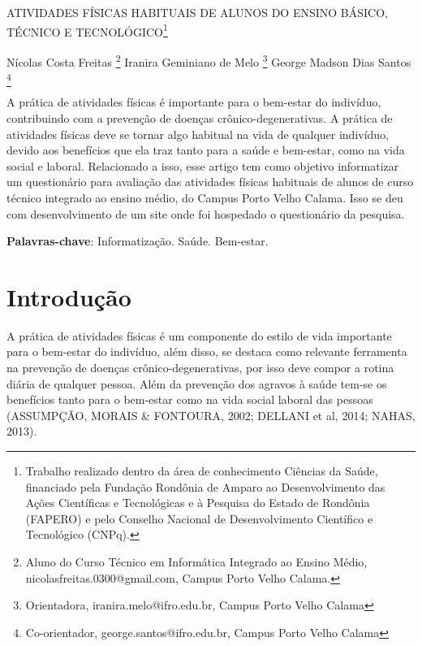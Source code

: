 \documentclass[article,12pt,onesidea,4paper,english,brazil,]{abntex2}
\begin{document}
	
	
	\frenchspacing 
	
	\begin{center}
		\LARGE ATIVIDADES FÍSICAS HABITUAIS DE ALUNOS DO ENSINO BÁSICO, TÉCNICO E TECNOLÓGICO\footnote{Trabalho realizado dentro da área de conhecimento Ciências da Saúde, financiado pela Fundação Rondônia de Amparo ao Desenvolvimento das Ações Científicas e Tecnológicas e à Pesquisa do Estado de Rondônia (FAPERO) e pelo Conselho Nacional de Desenvolvimento Científico e Tecnológico (CNPq).}
		
		\normalsize
	Nícolas Costa Freitas \footnote{Aluno do Curso Técnico em Informática Integrado ao Ensino Médio, nicolasfreitas.0300@gmail.com, Campus Porto Velho Calama.} 
		Iranira Geminiano de Melo \footnote{Orientadora, iranira.melo@ifro.edu.br, Campus Porto Velho Calama} 
	George Madson Dias Santos \footnote{Co-orientador, george.santos@ifro.edu.br, Campus Porto Velho Calama} 
		 
	\end{center}
	
	\begin{resumoumacoluna}
		A prática de atividades físicas é importante para o bem-estar do indivíduo, contribuindo com a prevenção de doenças crônico-degenerativas. A prática de atividades físicas deve se tornar algo habitual na vida de qualquer indivíduo, devido aos benefícios que ela traz tanto para a saúde e bem-estar, como na vida social e laboral. Relacionado a isso, esse artigo tem como objetivo informatizar um questionário para avaliação das atividades físicas habituais de alunos de curso técnico integrado ao ensino médio, do Campus Porto Velho Calama. Isso se deu com desenvolvimento de um site onde foi hospedado o questionário da pesquisa.
		
		\vspace{\onelineskip}
		
		\noindent
		\textbf{Palavras-chave}: Informatização. Saúde. Bem-estar.
	\end{resumoumacoluna}
	
	\section*{Introdução}
	
A prática de atividades físicas é um componente do estilo de vida importante para o bem-estar do indivíduo, além disso, se destaca como relevante ferramenta na prevenção de doenças crônico-degenerativas, por isso deve compor a rotina diária de qualquer pessoa. Além da prevenção dos agravos à saúde tem-se os benefícios tanto para o bem-estar como na vida social laboral das pessoas (ASSUMPÇÃO, MORAIS \& FONTOURA, 2002; DELLANI et al, 2014; NAHAS, 2013).
\end{document}
